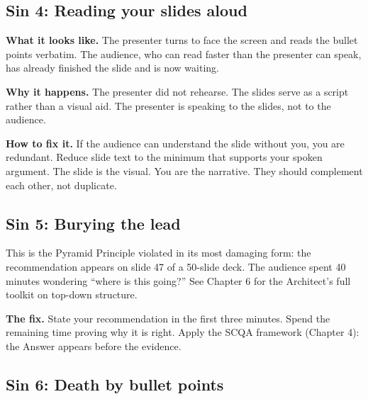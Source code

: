 
\subsection{Sin 4: Reading your slides aloud}

\textbf{What it looks like.} The presenter turns to face the screen and reads the bullet points verbatim. The audience, who can read faster than the presenter can speak, has already finished the slide and is now waiting.

\textbf{Why it happens.} The presenter did not rehearse. The slides serve as a script rather than a visual aid. The presenter is speaking to the slides, not to the audience.

\textbf{How to fix it.} If the audience can understand the slide without you, you are redundant. Reduce slide text to the minimum that supports your spoken argument. The slide is the visual. You are the narrative. They should complement each other, not duplicate.


\subsection{Sin 5: Burying the lead}

This is the Pyramid Principle violated in its most damaging form: the recommendation appears on slide 47 of a 50-slide deck. The audience spent 40 minutes wondering ``where is this going?'' See Chapter 6 for the Architect's full toolkit on top-down structure.

\textbf{The fix.} State your recommendation in the first three minutes. Spend the remaining time proving why it is right. Apply the SCQA framework (Chapter 4): the Answer appears before the evidence.


\subsection{Sin 6: Death by bullet points}

